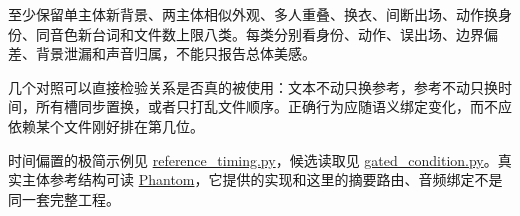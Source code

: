 至少保留单主体新背景、两主体相似外观、多人重叠、换衣、间断出场、动作换身份、同音色新台词和文件数上限八类。每类分别看身份、动作、误出场、边界偏差、背景泄漏和声音归属，不能只报告总体美感。

几个对照可以直接检验关系是否真的被使用：文本不动只换参考，参考不动只换时间，所有槽同步置换，或者只打乱文件顺序。正确行为应随语义绑定变化，而不应依赖某个文件刚好排在第几位。

时间偏置的极简示例见 \hyperref[code-reference-timing]{reference\_timing.py}，候选读取见 \hyperref[code-gated-condition]{gated\_condition.py}。真实主体参考结构可读 \href{https://github.com/Phantom-video/Phantom}{Phantom}，它提供的实现和这里的摘要路由、音频绑定不是同一套完整工程。
